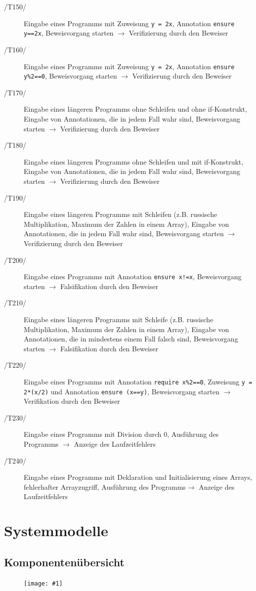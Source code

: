 \documentclass[a4paper,10pt]{article}
\newlength{\imgwidth}
\newcommand\scalegraphics[1]{
  \settowidth{\imgwidth}{\texttt{[image: \#1]}}
  \setlength{\imgwidth}{\minof{\imgwidth}{\textwidth}}
  \texttt{[image: \#1]}
}
\begin{document}
\begin{description}
\item[/T150/] Eingabe eines Programms mit Zuweisung \texttt{y = 2x}, Annotation \texttt{ensure y==2x}, Beweisvorgang starten $\to$ Verifizierung durch den Beweiser
\item[/T160/] Eingabe eines Programms mit Zuweisung \texttt{y = 2x}, Annotation \texttt{ensure y\%2==0}, Beweisvorgang starten $\to$ Verifizierung durch den Beweiser
\item[/T170/] Eingabe eines l\"{a}ngeren Programms ohne Schleifen und ohne if-Konstrukt, Eingabe von Annotationen, die in jedem Fall wahr sind, Beweisvorgang starten $\to$ Verifizierung durch den Beweiser
\item[/T180/] Eingabe eines l\"{a}ngeren Programms ohne Schleifen und mit if-Konstrukt, Eingabe von Annotationen, die in jedem Fall wahr sind, Beweisvorgang starten $\to$ Verifizierung durch den Beweiser
\item[/T190/] Eingabe eines l\"{a}ngeren Programms mit Schleifen (z.B. russische Multiplikation, Maximum der Zahlen in einem Array), Eingabe von Annotationen, die in jedem Fall wahr sind, Beweisvorgang starten $\to$ Verifizierung durch den Beweiser
\item[/T200/] Eingabe eines Programms mit Annotation \texttt{ensure x!=x}, Beweisvorgang starten $\to$ Falsifikation durch den Beweiser
\item[/T210/] Eingabe eines l\"{a}ngeren Programms mit Schleife (z.B. russische Multiplikation, Maximum der Zahlen in einem Array), Eingabe von Annotationen, die in mindestens einem Fall falsch sind, Beweisvorgang starten $\to$ Falsifikation durch den Beweiser
\item[/T220/] Eingabe eines Programms mit Annotation \texttt{require x\%2==0}, Zuweisung \texttt{y = 2*(x/2)} und Annotation \texttt{ensure (x==y)}, Beweisvorgang starten $\to$ Verifikation durch den Beweiser
\item[/T230/] Eingabe eines Programms mit Division durch 0, Ausf\"{u}hrung des Programms $\to$ Anzeige des Laufzeitfehlers
\item[/T240/] Eingabe eines Programms mit Deklaration und Initialisierung eines Arrays, fehlerhafter Arrayzugriff, Ausf\"{u}hrung des Programms$\to$ Anzeige des Laufzeitfehlers
\end{description}


\section{Systemmodelle}
\subsection{Komponenten\"{u}bersicht}
\begin{figure}[h!]
\scalegraphics{images/overview2.png}
\end{figure}
\end{document}
